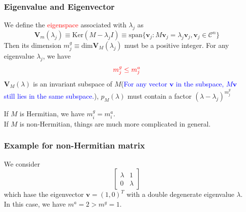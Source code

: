 \documentclass{beamer}
\begin{document}
\begin{frame}
\frametitle{Eigenvalue and Eigenvector}
We define the \textcolor{red}{eigenspace} associated with $\lambda_j$ as 
$$\mathbf{V}_m(\lambda_j)\equiv\mathrm{Ker}(M-\lambda_j I)\equiv\textrm{span}\{\mathbf{v}_j:M\mathbf{v}_j=\lambda_j\mathbf{v}_j,\mathbf{v}_j\in\mathcal{C}^n\}$$
Then its dimension $m^g_j\equiv \textrm{dim}\mathbf{V}_M(\lambda_j)$ must be a positive integer. For any eigenvalue $\lambda_j$, we have
\begin{equation}
\textcolor{red}{m^g_j\leq m^a_j}
\end{equation}
$\mathbf{V}_M(\lambda)$ is an invariant subspace of $M$(\textcolor{blue}{For any vector $\mathbf{v}$ in the subspace, $M\mathbf{v}$ still lies in the same subspace.}), $p_M(\lambda)$ must contain a factor $(\lambda-\lambda_j)^{m^g_j}$
\begin{block}{}
If $M$ is Hermitian, we have $m^g_i=m^a_i$.\\
If $M$ is non-Hermitian, things are much more complicated in general.
\end{block}
\end{frame}
\begin{frame}
\frametitle{Example for non-Hermitian matrix}
We consider
\begin{equation}
\left[
\begin{array}{cc}
\lambda&1\\
0&\lambda
\end{array}
\right]
\end{equation}
which hase the eigenvector $\mathbf{v}=(1,0)^T$ with a double degenerate eigenvalue $\lambda$. In this case, we have $m^a=2>m^g=1$.
\end{frame}
\end{document}
